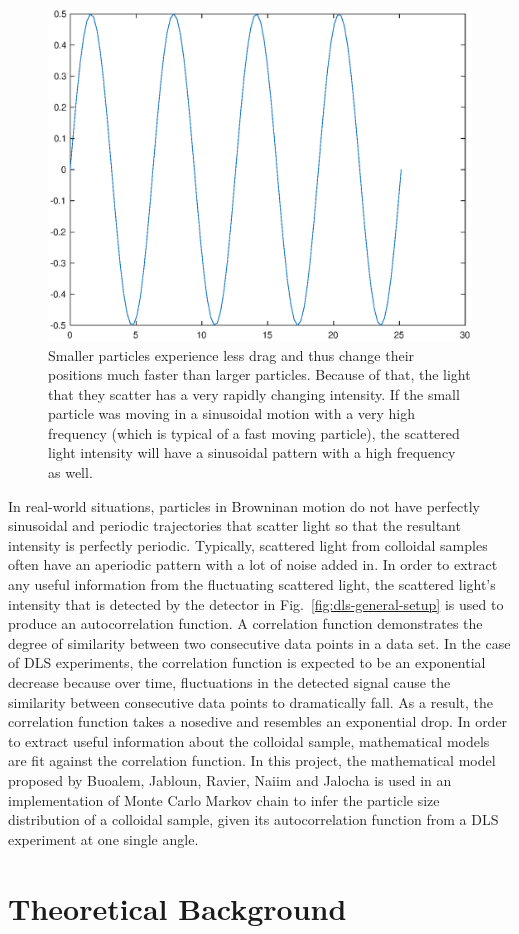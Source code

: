 \documentclass[11pt]{article}
\begin{document}
\begin{figure}
\centering
\includegraphics[width=0.4\linewidth]{small-particle-intensity.eps}
\caption{Smaller particles experience less drag and thus change their positions much faster than larger particles. Because of that, the light that they scatter has a very rapidly changing intensity. If the small particle was moving in a sinusoidal motion with a very high frequency (which is typical of a fast moving particle), the scattered light intensity will have a sinusoidal pattern with a high frequency as well.}
\label{fig:small-particle-intensity}
\end{figure}

In real-world situations, particles in Browninan motion do not have perfectly sinusoidal and periodic trajectories that scatter light so that the resultant intensity is perfectly periodic. Typically, scattered light from colloidal samples often have an aperiodic pattern with a lot of noise added in. In order to extract any useful information from the fluctuating scattered light, the scattered light's intensity that is detected by the detector in Fig.~\ref{fig:dls-general-setup} is used to produce an autocorrelation function. A correlation function demonstrates the degree of similarity between two consecutive data points in a data set. In the case of DLS experiments, the correlation function is expected to be an exponential decrease because over time, fluctuations in the detected signal cause the similarity between consecutive data points to dramatically fall. As a result, the correlation function takes a nosedive and resembles an exponential drop. In order to extract useful information about the colloidal sample, mathematical models are fit against the correlation function. In this project, the mathematical model proposed by Buoalem, Jabloun, Ravier, Naiim and Jalocha is used in an implementation of Monte Carlo Markov chain to infer the particle size distribution of a colloidal sample, given its autocorrelation function from a DLS experiment at one single angle. 

\section{Theoretical Background}
\end{document}
